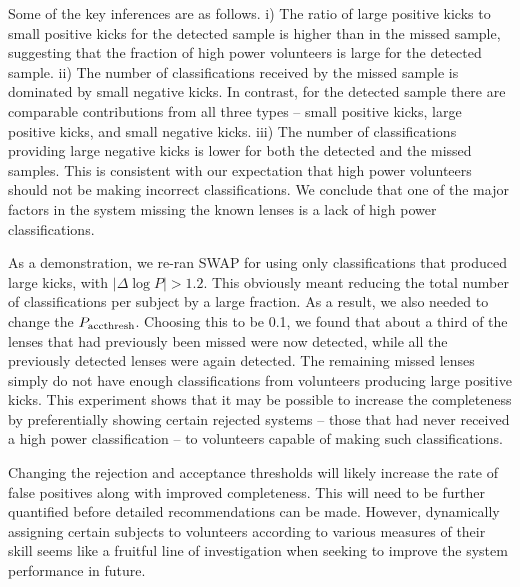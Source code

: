 \documentclass[useAMS,usenatbib,a4paper]{mn2e}
\begin{document}
Some of the key inferences are as follows.  i) The ratio of  large
positive kicks to small positive kicks for the detected sample is higher
than in the missed sample, suggesting that the fraction of high power
volunteers is large for the detected sample.  ii) The number of
classifications received by the missed sample is dominated by small
negative kicks. In contrast, for the detected sample there are
comparable contributions from all three types -- small positive kicks,
large positive kicks, and small negative kicks.  iii) The number of
classifications providing large negative kicks is lower for both the
detected and the missed samples. This is consistent with our expectation
that high power volunteers should not be making incorrect
classifications.  We conclude that one of the major factors in the \SW
system missing the known lenses is a lack of high power classifications.

As a demonstration, we re-ran SWAP for \StageOne using only  classifications
that produced large kicks, with $|\Delta \log{P}| > 1.2$.  This obviously meant
reducing the total number of classifications per subject by a large fraction.
As a result, we also needed to change the $P_{\rm acc thresh}$. Choosing this to
be 0.1, we found that about a third of the lenses that had previously been
missed were now detected, while all the previously detected lenses were again
detected. The remaining missed lenses simply do not have enough classifications
from volunteers producing large positive kicks. This experiment shows that it
may be possible to increase the  \sw completeness  by preferentially showing
certain rejected systems -- those that  had never received a high power
classification --  to  volunteers capable of making such classifications.

Changing the rejection and acceptance thresholds will likely increase
the rate of false positives along with improved completeness.  This will
need to be further quantified before detailed recommendations can be
made. However, dynamically assigning certain subjects to volunteers
according to various measures of their skill seems like a fruitful line
of investigation when seeking to improve the system performance in
future.
\end{document}
